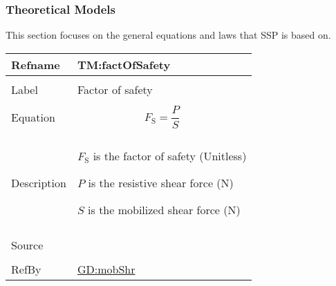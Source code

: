 \documentclass[12pt]{article}
\begin{document}
\subsubsection{Theoretical Models}
\label{Sec:TMs}
This section focuses on the general equations and laws that SSP is based on.

\vspace{\baselineskip}
\noindent
\begin{minipage}{\textwidth}
\begin{tabular}{>{\raggedright}p{}>{\raggedright\arraybackslash}p{}}
\toprule \textbf{Refname} & \textbf{TM:factOfSafety}
\label{TM:factOfSafety}
\\ \midrule \\
Label & Factor of safety
        
\\ \midrule \\
Equation & \begin{displaymath}
           {F_{\text{S}}}=\frac{P}{S}
           \end{displaymath}
\\ \midrule \\
Description & \begin{symbDescription}
              \item{${F_{\text{S}}}$ is the factor of safety (Unitless)}
              \item{$P$ is the resistive shear force (${\text{N}}$)}
              \item{$S$ is the mobilized shear force (${\text{N}}$)}
              \end{symbDescription}
\\ \midrule \\
Source & \cite{fredlund1977}
         
\\ \midrule \\
RefBy & \hyperref[GD:mobShr]{GD:mobShr}
        
\\ \bottomrule
\end{tabular}
\end{minipage}
\vspace{\baselineskip}
\noindent
\end{document}
